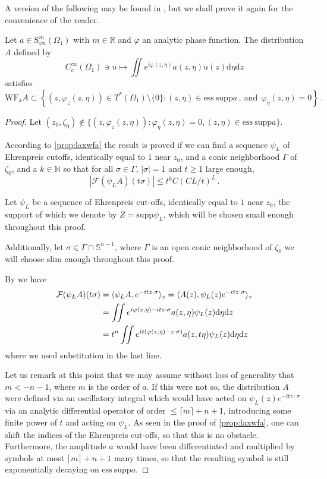 \documentclass[
	fontsize=11pt, 
	twoside=false, 
	abstract=true, 
	a4paper,
]{scrartcl}
\newcommand{\sem}{\setminus\{0\}}
\newcommand{\RR}{\mathbb{R}}
\newcommand{\dd}{\mathrm{d}}
\newcommand{\abs}[1]{\left\lvert#1\right\rvert}
\newcommand{\supp}{\mathrm{supp}}
\newcommand{\wf}{\mathrm{WF}_{\mathrm{a}}}
\newcommand{\es}{\mathrm{ess}\ \mathrm{supp}}
\begin{document}
A version of the following may be found in \cite[Prop.~D.3]{zbMATH07465842}, but we shall prove it again for the convenience of the reader. 
\begin{proposition}\label{prop:wfaexp}
	Let $a\in \mathrm{S}^m_{\psi a}(\Omega_1)$ with $m\in \RR$ and $\varphi$ an analytic phase function. The distribution $A$ defined by
	\[
		C_c^\infty(\Omega_1) \ni u \mapsto \iint e^{i\varphi(z,\eta)}a(z,\eta)u(z)\dd\eta\dd z
	\]
	satisfies
	\[
		\wf{A} \subset \left\{(z, \varphi_z(z,\eta))\in T^\ast(\Omega_1)\sem \colon (z,\eta)\in \es a\,,\ \text{and}\ \ \varphi_\eta(z,\eta) = 0\right\}\,.
	\]
	\end{proposition}
\begin{proof}
	Let $(z_0, \zeta_0) \not\in \{ (z, \varphi_z(z,\eta)) \colon \varphi_\eta(z,\eta) = 0, (z,\eta) \in \es a\}$. 

	According to \cref{prop:laxwfa} the result is proved if we can find a sequence $\psi_L$ of Ehrenpreis cutoffs, identically equal to $1$ near $z_0$, and a conic neighborhood $\Gamma$ of $\zeta_0$, and a $k\in\mathbb{N}$ so that for all $\sigma\in\Gamma$, $\abs{\sigma} = 1$ and $t\geq 1$ large enough, 
	\[
		\abs{\mathcal{F}(\psi_L A)(t\sigma)} \leq t^k C(CL/t)^L\,.
	\]
	
	Let $\psi_L$ be a sequence of Ehrenpreis cut-offs, identically equal to $1$ near $z_0$, the support of which we denote by $Z=\supp \psi_L$, which will be chosen small enough throughout this proof. 

	Additionally, let $\sigma \in \Gamma \cap \mathbb{S}^{n-1}$, where $\Gamma$ is an open conic neighborhood of $\zeta_0$ we will choose slim enough throughout this proof.

	By \cite[Thm.~8.4.1]{MR1721032} we have
	\begin{align}
		\mathcal{F}(\psi_L A)(t\sigma) &= \langle \psi_L A, e^{-it z\cdot \sigma} \rangle_z = \langle A(z), \psi_L(z) e^{-it z\cdot \sigma}\rangle_z \notag \\
		&= \iint e^{i\varphi(z,\eta)-itz\cdot \sigma}a(z,\eta)\psi_L(z)\dd\eta\dd z \notag \\ 
		&= t^n \iint e^{it(\varphi(z,\eta)-z\cdot \sigma)}a(z,t\eta)\psi_L(z)\dd\eta\dd z \label{eq:subs}
	\end{align}
	where we used substitution in the last line.

	Let us remark at this point that we may assume without loss of generality that $m<-n-1$, where $m$ is the order of $a$. If this were not so, the distribution $A$ were defined via an oscillatory integral which would have acted on $\psi_L(z) e^{-itz\cdot \sigma}$ via an analytic differential operator of order $\leq \lceil m\rceil + n + 1$, introducing some finite power of $t$ and acting on $\psi_L$. As seen in the proof of \cref{prop:laxwfa}, one can shift the indices of the Ehrenpreis cut-offs, so that this is no obstacle. Furthermore, the amplitude $a$ would have been differentiated and multiplied by symbols at most $\lceil m\rceil +n+1$ many times, so that the resulting symbol is still exponentially decaying on $\es a$.


\end{proof}
\end{document}
